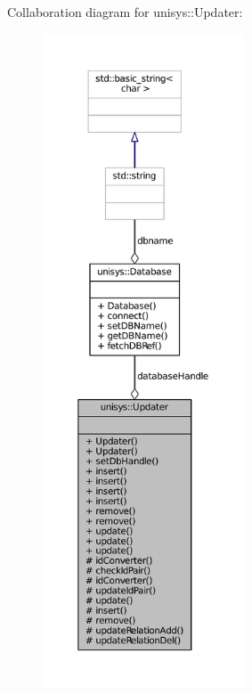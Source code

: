 Collaboration diagram for unisys\-:\-:Updater\-:
\nopagebreak
\begin{figure}[H]
\begin{center}
\leavevmode
\includegraphics[height=550pt]{classunisys_1_1Updater__coll__graph}
\end{center}
\end{figure}
